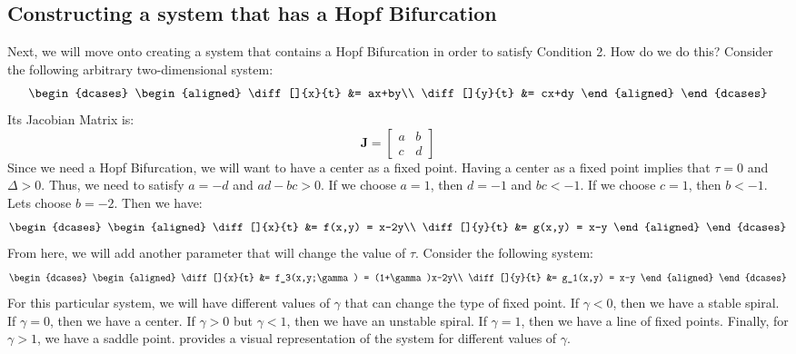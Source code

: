 \subsection{Constructing a system that has a Hopf Bifurcation}\label{subsec:constructing-a-system-that-has-a-hopf-bifurcation}
Next, we will move onto creating a system that contains a Hopf Bifurcation in order to satisfy Condition 2. How do we do this? Consider the following arbitrary two-dimensional system:
\begin{equation*}
    \begin{dcases}
        \begin{aligned}
            \diff[]{x}{t} &= ax+by\\
            \diff[]{y}{t} &= cx+dy
        \end{aligned}
    \end{dcases}
\end{equation*}
Its Jacobian Matrix is:
\begin{equation*}
    \textbf{J} = \begin{bmatrix}
        a & b\\
        c & d
    \end{bmatrix}
\end{equation*}
Since we need a Hopf Bifurcation, we will want to have a center as a fixed point. Having a center as a fixed point implies that $\tau=0$ and $\Delta>0$. Thus, we need to satisfy $a=-d$ and $ad-bc>0$. If we choose $a=1$, then $d=-1$ and $bc<-1$. If we choose $c=1$, then $b<-1$. Lets choose $b=-2$. Then we have:
\begin{equation*}
    \begin{dcases}
        \begin{aligned}
            \diff[]{x}{t} &= f(x,y) = x-2y\\
            \diff[]{y}{t} &= g(x,y) = x-y
        \end{aligned}
    \end{dcases}
\end{equation*}
From here, we will add another parameter that will change the value of $\tau$. Consider the following system:
\begin{equation*}
    \begin{dcases}
        \begin{aligned}
            \diff[]{x}{t} &= f_3(x,y;\gamma) = (1+\gamma)x-2y\\
            \diff[]{y}{t} &= g_1(x,y) = x-y
        \end{aligned}
    \end{dcases}
\end{equation*}
For this particular system, we will have different values of $\gamma$ that can change the type of fixed point. If $\gamma<0$, then we have a stable spiral. If $\gamma=0$, then we have a center. If $\gamma>0$ but $\gamma<1$, then we have an unstable spiral. If $\gamma=1$, then we have a line of fixed points. Finally, for $\gamma>1$, we have a saddle point.  provides a visual representation of the system for different values of $\gamma$.

